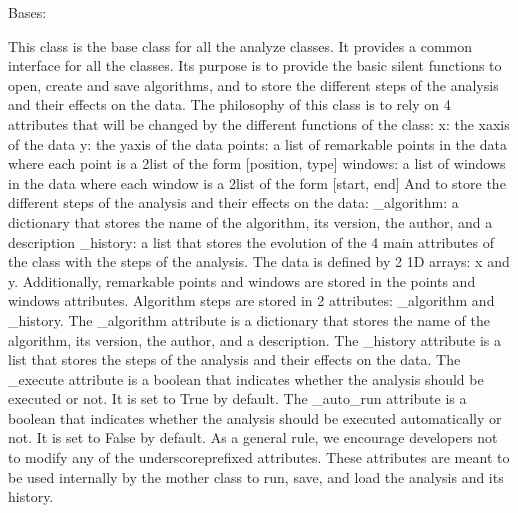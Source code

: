 \documentclass[letterpaper,10pt,english]{sphinxmanual}
\begin{document}
\begin{fulllineitems}
\label{\detokenize{_autosummary/HDF5_BLS.analyze:HDF5_BLS.analyze.Analyze}}
\pysigstartsignatures
\pysiglinewithargsret
{}
{\sphinxparamcomma {}}
{}
\pysigstopsignatures
\sphinxAtStartPar
Bases: 

\sphinxAtStartPar
This class is the base class for all the analyze classes. It provides a common interface for all the classes. Its purpose is to provide the basic silent functions to open, create and save algorithms, and to store the different steps of the analysis and their effects on the data.
The philosophy of this class is to rely on 4 attributes that will be changed by the different functions of the class:
\sphinxhyphen{} x: the x\sphinxhyphen{}axis of the data
\sphinxhyphen{} y: the y\sphinxhyphen{}axis of the data
\sphinxhyphen{} points: a list of remarkable points in the data where each point is a 2\sphinxhyphen{}list of the form {[}position, type{]}
\sphinxhyphen{} windows: a list of windows in the data where each window is a 2\sphinxhyphen{}list of the form {[}start, end{]}
And to store the different steps of the analysis and their effects on the data:
\sphinxhyphen{} \_algorithm: a dictionary that stores the name of the algorithm, its version, the author, and a description
\sphinxhyphen{} \_history: a list that stores the evolution of the 4 main attributes of the class with the steps of the analysis.
The data is defined by 2 1\sphinxhyphen{}D arrays: x and y. Additionally, remarkable points and windows are stored in the points and windows attributes.
Algorithm steps are stored in 2 attributes: \_algorithm and \_history. The \_algorithm attribute is a dictionary that stores the name of the algorithm, its version, the author, and a description. The \_history attribute is a list that stores the steps of the analysis and their effects on the data.
The \_execute attribute is a boolean that indicates whether the analysis should be executed or not. It is set to True by default. The \_auto\_run attribute is a boolean that indicates whether the analysis should be executed automatically or not. It is set to False by default.
As a general rule, we encourage developers not to modify any of the underscore\sphinxhyphen{}prefixed attributes. These attributes are meant to be used internally by the mother class to run, save, and load the analysis and its history.

\end{fulllineitems}
\end{document}
